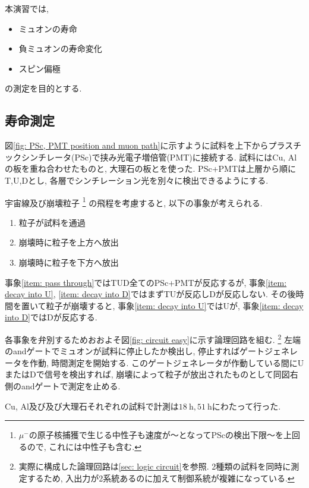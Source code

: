 \documentclass[dvipdfmx]{jsarticle}
\begin{document}
本演習では,
\begin{itemize}
    \item ミュオンの寿命
    \item 負ミュオンの寿命変化
    \item スピン偏極
\end{itemize}
の測定を目的とする.

\subsection{寿命測定}
\label{sec: method: life}

図\ref{fig: PSc, PMT position and muon path}に示すように試料を上下からプラスチックシンチレータ(PSc)で挟み光電子増倍管(PMT)に接続する.
試料にはCu, Alの板を重ね合わせたものと, 大理石の板とを使った.
PSc+PMTは上層から順にT,U,Dとし, 各層でシンチレーション光を別々に検出できるようにする.

宇宙線及び崩壊粒子
\footnote{$\mu^-$の原子核捕獲で生じる中性子も速度が〜となってPScの検出下限〜を上回るので, これには中性子も含む. }
の飛程を考慮すると, 以下の事象が考えられる.
\renewcommand{\theenumi}{(\alph{enumi})}
\begin{enumerate}
    \item \label{item: pass through}粒子が試料を通過
    \item \label{item: decay into U}崩壊時に粒子を上方へ放出
    \item \label{item: decay into D}崩壊時に粒子を下方へ放出
\end{enumerate}
事象\ref{item: pass through}ではTUD全てのPSc+PMTが反応するが, 事象\ref{item: decay into U}, \ref{item: decay into D}ではまずTUが反応しDが反応しない.
その後時間を置いて粒子が崩壊すると, 事象\ref{item: decay into U}ではUが, 事象\ref{item: decay into D}ではDが反応する.

各事象を弁別するためおおよそ図\ref{fig: circuit easy}に示す論理回路を組む.
\footnote{実際に構成した論理回路は\ref{sec: logic circuit}を参照. 2種類の試料を同時に測定するため, 入出力が2系統あるのに加えて制御系統が複雑になっている. }
左端のandゲートでミュオンが試料に停止したか検出し, 停止すればゲートジェネレータを作動, 時間測定を開始する.
このゲートジェネレータが作動している間にUまたはDで信号を検出すれば, 崩壊によって粒子が放出されたものとして同図右側のandゲートで測定を止める.

Cu, Al及び及び大理石それぞれの試料で計測は$\SI{18}{\hour}, \SI{51}{\hour}$にわたって行った.
\end{document}
